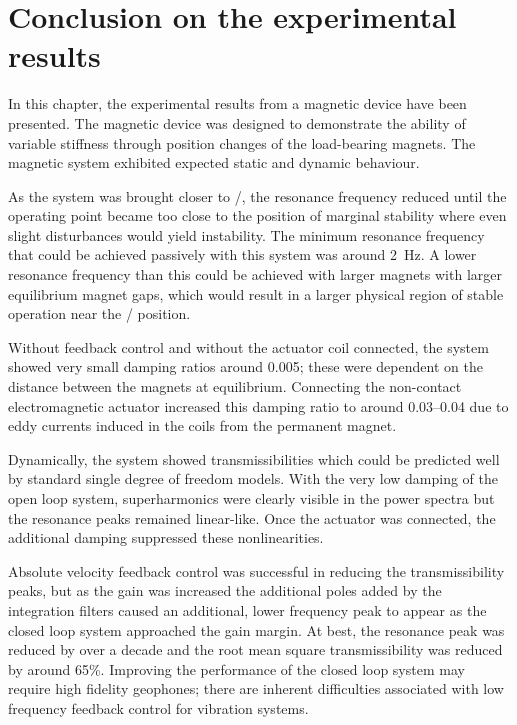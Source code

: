 \documentclass[11pt,a4paper]{memoir}
\begin{document}
\section{Conclusion on the experimental results}

In this chapter, the experimental results from a magnetic device have been presented.
The magnetic device was designed to demonstrate the ability of variable stiffness through position changes of the load-bearing magnets.
The magnetic system exhibited expected static and dynamic behaviour.

As the system was brought closer to \qzs/, the resonance frequency reduced until the operating point became too close to the position of marginal stability where even slight disturbances would yield instability.
The minimum resonance frequency that could be achieved passively with this system was around \SI{2}{Hz}.
A lower resonance frequency than this could be achieved with larger magnets with larger equilibrium magnet gaps, which would result in a larger physical region of stable operation near the \qzs/ position.

Without feedback control and without the actuator coil connected, the system showed very small damping ratios around \num{0.005}; these were dependent on the distance between the magnets at equilibrium.
Connecting the non-contact electromagnetic actuator increased this damping ratio to around \num{0.03}--\num{0.04} due to eddy currents induced in the coils from the permanent magnet.

Dynamically, the system showed transmissibilities which could be predicted well by standard single degree of freedom models.
With the very low damping of the open loop system, superharmonics were clearly visible in the power spectra but the resonance peaks remained linear-like.
Once the actuator was connected, the additional damping suppressed these nonlinearities.

Absolute velocity feedback control was successful in reducing the transmissibility peaks, but as the gain was increased the additional poles added by the integration filters caused an additional, lower frequency peak to appear as the closed loop system approached the gain margin.
At best, the resonance peak was reduced by over a decade and the root mean square transmissibility was reduced by around 65\%.
Improving the performance of the closed loop system may require high fidelity geophones; there are inherent difficulties associated with low frequency feedback control for vibration systems.
\end{document}
